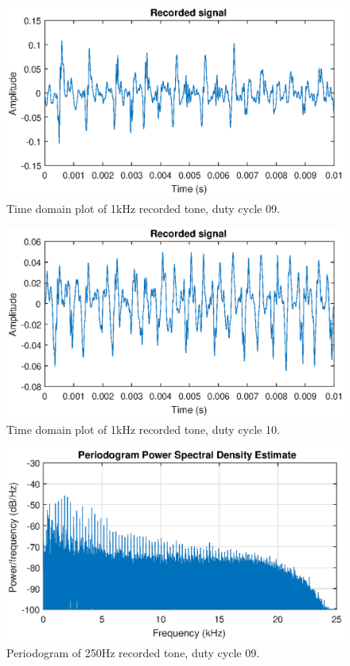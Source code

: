 \begin{figure}[H]
    \centering
    \includegraphics[trim={0cm 1.6cm 0cm 2cm},clip,width=\textwidth]{img/Recorded_1khz-09.eps}
    \caption{Time domain plot of 1kHz recorded tone, duty cycle 09.}
    \label{fig:appdx:wave_1k-09}
\end{figure}
\begin{figure}[H]
    \centering
    \includegraphics[trim={0cm 1.6cm 0cm 2cm},clip,width=\textwidth]{img/akustisk/Waveform_1kHz-10.eps}
    \caption{Time domain plot of 1kHz recorded tone, duty cycle 10.}
    \label{fig:appdx:wave_1k-10}
\end{figure}
\begin{figure}[H]
    \centering
    \includegraphics[trim={0cm 1.6cm 0cm 2cm},clip,width=\textwidth]{img/akustisk/Periodogram_250Hz-09.eps}
    \caption{Periodogram of 250Hz recorded tone, duty cycle 09.}
    \label{fig:period_250-09}
\end{figure}
